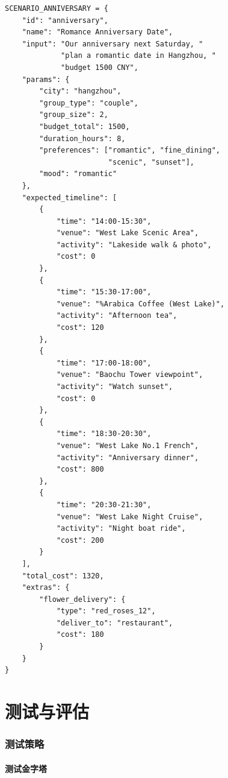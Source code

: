 \documentclass[12pt,a4paper]{ctexart}
\begin{document}
\begin{lstlisting}[caption={情侣纪念日场景预建数据}]
SCENARIO_ANNIVERSARY = {
    "id": "anniversary",
    "name": "Romance Anniversary Date",
    "input": "Our anniversary next Saturday, "
             "plan a romantic date in Hangzhou, "
             "budget 1500 CNY",
    "params": {
        "city": "hangzhou",
        "group_type": "couple",
        "group_size": 2,
        "budget_total": 1500,
        "duration_hours": 8,
        "preferences": ["romantic", "fine_dining",
                        "scenic", "sunset"],
        "mood": "romantic"
    },
    "expected_timeline": [
        {
            "time": "14:00-15:30",
            "venue": "West Lake Scenic Area",
            "activity": "Lakeside walk & photo",
            "cost": 0
        },
        {
            "time": "15:30-17:00",
            "venue": "%Arabica Coffee (West Lake)",
            "activity": "Afternoon tea",
            "cost": 120
        },
        {
            "time": "17:00-18:00",
            "venue": "Baochu Tower viewpoint",
            "activity": "Watch sunset",
            "cost": 0
        },
        {
            "time": "18:30-20:30",
            "venue": "West Lake No.1 French",
            "activity": "Anniversary dinner",
            "cost": 800
        },
        {
            "time": "20:30-21:30",
            "venue": "West Lake Night Cruise",
            "activity": "Night boat ride",
            "cost": 200
        }
    ],
    "total_cost": 1320,
    "extras": {
        "flower_delivery": {
            "type": "red_roses_12",
            "deliver_to": "restaurant",
            "cost": 180
        }
    }
}
\end{lstlisting}

\newpage


\part{测试与评估}

\section{测试策略}

\subsection{测试金字塔}
\end{document}
